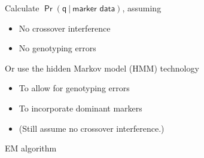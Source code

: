 \documentclass[12pt]{article}
\newcommand{\headsize}{\fontsize{35}{35} \selectfont}
\newcommand{\smallersize}{\fontsize{20}{25} \selectfont}
\begin{document}
\vspace{15mm}

\hfill
\begin{minipage}{10in}
\color{mywhite} \smallersize
Calculate {\color{myblue} $\mathsf{\Pr(q \ | \ \text{marker data})}$}, assuming
\begin{itemize}
\item No crossover interference
\item No genotyping errors
\end{itemize}

\vspace{10mm}

Or use the {\color{mypink} hidden Markov model (HMM)} technology
\begin{itemize}
\item To allow for genotyping errors
\item To incorporate dominant markers
\item {\color{myblue} (Still assume no crossover interference.)}
\end{itemize}
\end{minipage}



\newpage

\headsize \color{myyellow}
\hfill \begin{minipage}{5.75in}
\centering
EM algorithm
\end{minipage}

\vspace{15mm}
\end{document}
